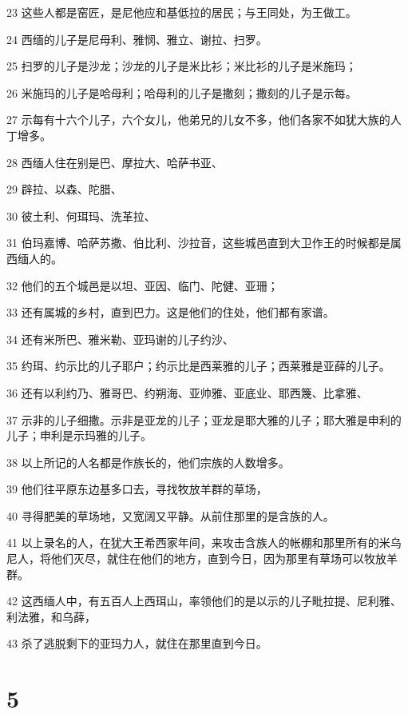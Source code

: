 \par 23 这些人都是窑匠，是尼他应和基低拉的居民；与王同处，为王做工。
\par 24 西缅的儿子是尼母利、雅悯、雅立、谢拉、扫罗。
\par 25 扫罗的儿子是沙龙；沙龙的儿子是米比衫；米比衫的儿子是米施玛；
\par 26 米施玛的儿子是哈母利；哈母利的儿子是撒刻；撒刻的儿子是示每。
\par 27 示每有十六个儿子，六个女儿，他弟兄的儿女不多，他们各家不如犹大族的人丁增多。
\par 28 西缅人住在别是巴、摩拉大、哈萨书亚、
\par 29 辟拉、以森、陀腊、
\par 30 彼土利、何珥玛、洗革拉、
\par 31 伯玛嘉博、哈萨苏撒、伯比利、沙拉音，这些城邑直到大卫作王的时候都是属西缅人的。
\par 32 他们的五个城邑是以坦、亚因、临门、陀健、亚珊；
\par 33 还有属城的乡村，直到巴力。这是他们的住处，他们都有家谱。
\par 34 还有米所巴、雅米勒、亚玛谢的儿子约沙、
\par 35 约珥、约示比的儿子耶户；约示比是西莱雅的儿子；西莱雅是亚薛的儿子。
\par 36 还有以利约乃、雅哥巴、约朔海、亚帅雅、亚底业、耶西篾、比拿雅、
\par 37 示非的儿子细撒。示非是亚龙的儿子；亚龙是耶大雅的儿子；耶大雅是申利的儿子；申利是示玛雅的儿子。
\par 38 以上所记的人名都是作族长的，他们宗族的人数增多。
\par 39 他们往平原东边基多口去，寻找牧放羊群的草场，
\par 40 寻得肥美的草场地，又宽阔又平静。从前住那里的是含族的人。
\par 41 以上录名的人，在犹大王希西家年间，来攻击含族人的帐棚和那里所有的米乌尼人，将他们灭尽，就住在他们的地方，直到今日，因为那里有草场可以牧放羊群。
\par 42 这西缅人中，有五百人上西珥山，率领他们的是以示的儿子毗拉提、尼利雅、利法雅，和乌薛，
\par 43 杀了逃脱剩下的亚玛力人，就住在那里直到今日。

\chapter{5}

